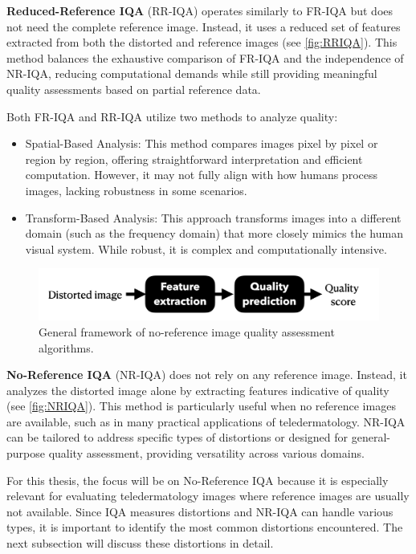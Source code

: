 \noindent
\textbf{Reduced-Reference IQA} (RR-IQA) operates similarly to FR-IQA but does not need the complete reference image. Instead, it uses a reduced set of features extracted from both the distorted and reference images (see \autoref{fig:RRIQA}). This method balances the exhaustive comparison of FR-IQA and the independence of NR-IQA, reducing computational demands while still providing meaningful quality assessments based on partial reference data. \par
\vspace{\baselineskip}
\noindent
Both FR-IQA and RR-IQA utilize two methods to analyze quality:
\begin{itemize}
    \item Spatial-Based Analysis: This method compares images pixel by pixel or region by region, offering straightforward interpretation and efficient computation. However, it may not fully align with how humans process images, lacking robustness in some scenarios.
    \item Transform-Based Analysis: This approach transforms images into a different domain (such as the frequency domain) that more closely mimics the human visual system. While robust, it is complex and computationally intensive.
\end{itemize}
\vspace{\baselineskip}
\begin{figure}[ht]
    \centering
    \includegraphics[keepaspectratio,width=15cm]{img/NRIQA.jpg}
    \caption{General framework of no-reference image quality assessment algorithms.}
    \label{fig:NRIQA}
\end{figure}
\noindent
\textbf{No-Reference IQA} (NR-IQA) does not rely on any reference image. Instead, it analyzes the distorted image alone by extracting features indicative of quality (see \autoref{fig:NRIQA}). This method is particularly useful when no reference images are available, such as in many practical applications of teledermatology. NR-IQA can be tailored to address specific types of distortions or designed for general-purpose quality assessment, providing versatility across various domains. \par
\vspace{\baselineskip}
\noindent
For this thesis, the focus will be on No-Reference IQA because it is especially relevant for evaluating teledermatology images where reference images are usually not available. Since IQA measures distortions and NR-IQA can handle various types, it is important to identify the most common distortions encountered. The next subsection will discuss these distortions in detail. \par


